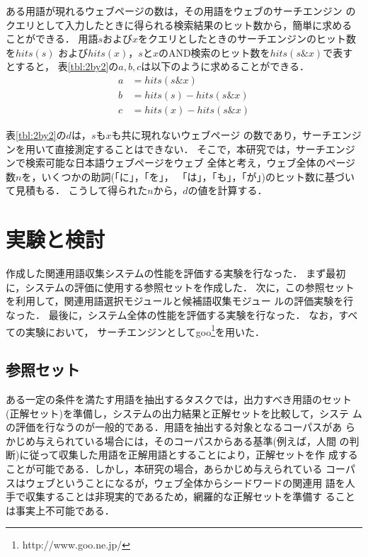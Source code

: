 ある用語が現れるウェブページの数は，その用語をウェブのサーチエンジン
のクエリとして入力したときに得られる検索結果のヒット数から，簡単に求める
ことができる．
用語$s$および$x$をクエリとしたときのサーチエンジンのヒット数を$hits(s)$
および$hits(x)$，$s$と$x$のAND検索のヒット数を$hits(s\&x)$で表すとすると，
\mbox{表\ref{tbl:2by2}}の$a,b,c$は以下のように求めることができる．
\begin{align*}
 a &= hits(s\&x)\\
 b &= hits(s)-hits(s\&x)\\
 c &= hits(x)-hits(s\&x)
\end{align*}

\mbox{表\ref{tbl:2by2}}の$d$は，$s$も$x$も共に現れないウェブページ
の数であり，サーチエンジンを用いて直接測定することはできない．
そこで，本研究では，サーチエンジンで検索可能な日本語ウェブページをウェブ
全体と考え，ウェブ全体のページ数$n$を，いくつかの助詞(「に」，「を」，
「は」，「も」，「が」)のヒット数に基づいて見積もる．
こうして得られた$n$から，$d$の値を計算する．


\section{実験と検討} \label{chap4}

作成した関連用語収集システムの性能を評価する実験を行なった．
まず最初に，システムの評価に使用する参照セットを作成した．
次に，この参照セットを利用して，関連用語選択モジュールと候補語収集モジュー
ルの評価実験を行なった．
最後に，システム全体の性能を評価する実験を行なった．
なお，すべての実験において，
サーチエンジンとしてgoo\footnote{http://www.goo.ne.jp/}を用いた．

\subsection{参照セット}\label{sec:reference}

ある一定の条件を満たす用語を抽出するタスクでは，出力すべき用語のセット
(正解セット)を準備し，システムの出力結果と正解セットを比較して，システ
ムの評価を行なうのが一般的である．用語を抽出する対象となるコーパスがあ
らかじめ与えられている場合には，そのコーパスからある基準(例えば，人間
の判断)に従って収集した用語を正解用語とすることにより，正解セットを作
成することが可能である．しかし，本研究の場合，あらかじめ与えられている
コーパスはウェブということになるが，ウェブ全体からシードワードの関連用
語を人手で収集することは非現実的であるため，網羅的な正解セットを準備す
ることは事実上不可能である．

